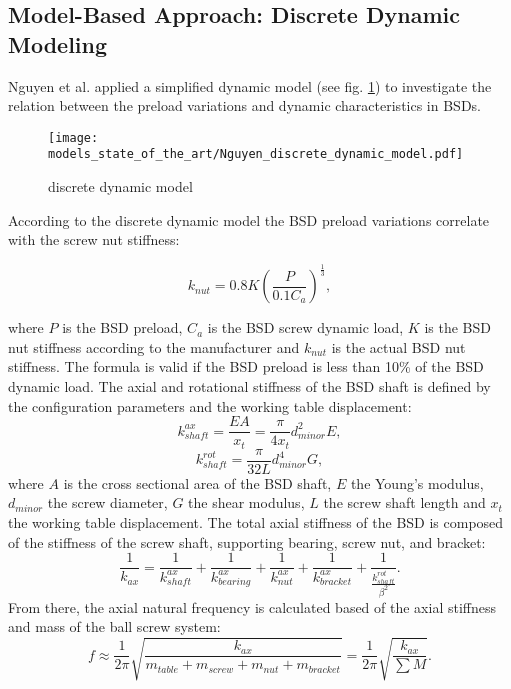 \subsection{Model-Based Approach: Discrete Dynamic Modeling}
Nguyen et al. \cite{NGUYEN2019} applied a simplified dynamic model (see fig. \ref{fig:Nguyen_discrete_dynamic_model}) to investigate the relation between the preload variations and dynamic characteristics in BSDs.

\begin{figure}[H]
  \centering
  \texttt{[image: models\_state\_of\_the\_art/Nguyen\_discrete\_dynamic\_model.pdf]}
  \caption{discrete dynamic model \cite{NGUYEN2019}}
  \label{fig:Nguyen_discrete_dynamic_model}
\end{figure}

According to the discrete dynamic model the BSD preload variations correlate with the screw nut stiffness:

\begin{equation}
    k_{nut}=0.8K(\frac{P}{0.1C_{a}})^{\frac{1}{3}},
\end{equation}

where $P$ is the BSD preload, $C_{a}$ is the BSD screw dynamic load, $K$ is the BSD nut stiffness according to the manufacturer and $k_{nut}$ is the actual BSD nut stiffness. The formula is valid if the BSD preload is less than 10\% of the BSD dynamic load. The axial and rotational stiffness of the BSD shaft is defined by the configuration parameters and the working table displacement:
\begin{equation}
    k_{shaft}^{ax}=\frac{EA}{x_{t}}=\frac{\pi}{4x_{t}}d_{minor}^{2}E,
\end{equation}
\begin{equation}
    k_{shaft}^{rot}=\frac{\pi}{32L}d_{minor}^{4}G,
\end{equation}
 where $A$ is the cross sectional area of the BSD shaft, $E$ the Young’s modulus, $d_{minor}$ the screw diameter, $G$ the shear modulus, $L$ the screw shaft length and $x_{t}$ the working table displacement. The total axial stiffness of the BSD is composed of the stiffness of the screw shaft, supporting bearing, screw nut, and bracket:
 \begin{equation}
    \frac{1}{k_{ax}}=\frac{1}{k_{shaft}^{ax}}+\frac{1}{k_{bearing}^{ax}}+\frac{1}{k_{nut}^{ax}}+\frac{1}{k_{bracket}^{ax}}+\frac{1}{\frac{k_{shaft}^{rot}}{\beta^{2}}}.
\end{equation}
From there, the axial natural frequency is calculated based of the axial stiffness and mass of the ball screw system:
\begin{equation}
    f\approx\frac{1}{2\pi}\sqrt{\frac{k_{ax}}{m_{table}+m_{screw}+m_{nut}+m_{bracket}}}=\frac{1}{2\pi}\sqrt{\frac{k_{ax}}{\sum M}}.
\end{equation}

